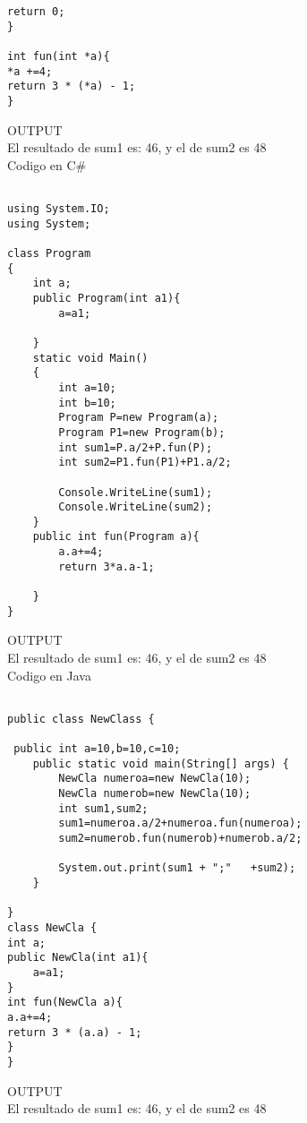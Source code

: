 \documentclass[12pt,oneside]{article}
\begin{document}
\begin{itemize}
\begin{lstlisting}[frame=single]
   return 0;
}

int fun(int *a){
*a +=4;
return 3 * (*a) - 1;
}

\end{lstlisting}
OUTPUT\\
El resultado de sum1 es: 46, y el de sum2 es 48\\
 

Codigo en C\#\\
\begin{lstlisting}[frame=single]  % Start your code-block

using System.IO;
using System;

class Program
{
    int a;
    public Program(int a1){
        a=a1;
        
    }
    static void Main()
    {
        int a=10;
        int b=10;
        Program P=new Program(a);
        Program P1=new Program(b);
        int sum1=P.a/2+P.fun(P);
        int sum2=P1.fun(P1)+P1.a/2;
        
        Console.WriteLine(sum1);
        Console.WriteLine(sum2);
    }
    public int fun(Program a){
        a.a+=4;
        return 3*a.a-1;
        
    }
}

\end{lstlisting}
OUTPUT\\
El resultado de sum1 es: 46, y el de sum2 es 48\\
 


Codigo en Java\\
\begin{lstlisting}[frame=single]  % Start your code-block

public class NewClass {
    
 public int a=10,b=10,c=10;
    public static void main(String[] args) {
        NewCla numeroa=new NewCla(10);
        NewCla numerob=new NewCla(10);
        int sum1,sum2;
        sum1=numeroa.a/2+numeroa.fun(numeroa);
        sum2=numerob.fun(numerob)+numerob.a/2;

        System.out.print(sum1 + ";"   +sum2);
    }

}
class NewCla {
int a;
public NewCla(int a1){
    a=a1;
}    
int fun(NewCla a){
a.a+=4;
return 3 * (a.a) - 1;
}
}

\end{lstlisting}
OUTPUT\\
El resultado de sum1 es: 46, y el de sum2 es 48\\


\end{itemize}
\end{document}
